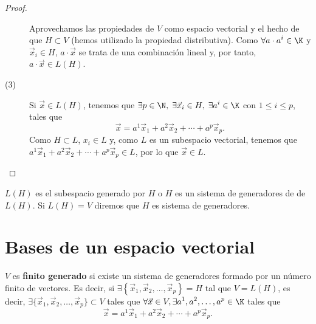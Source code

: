 \begin{proof}
\begin{description}
\[\]
Aprovechamos las propiedades de $\displaystyle V $ como espacio vectorial y el hecho de que $\displaystyle H \subset V $ (hemos utilizado la propiedad distributiva). Como $\displaystyle \forall a \cdot a^{i}\in\K $ y $\displaystyle \vec{x}_{i} \in H $, $\displaystyle a \cdot \vec{x} $ se trata de una combinación lineal y, por tanto, $\displaystyle a \cdot \vec{x} \in L\left(H\right) $.
\item[(3)] Si $\displaystyle \vec{x} \in L\left(H\right) $, tenemos que $\displaystyle \exists p \in \N, \; \exists \vec{x}_{i}\in H, \; \exists a ^{i} \in \K $ con $\displaystyle 1 \leq i \leq p $, tales que 
	\[ \vec{x} = a^{1}\vec{x}_{1}+a^{2}\vec{x}_{2} + \cdots + a^{p}\vec{x}_{p} .\]
Como $\displaystyle H \subset L $, $\displaystyle x_{i} \in L $ y, como $\displaystyle L $ es un subespacio vectorial, tenemos que $\displaystyle  a^{1}\vec{x}_{1}+a^{2}\vec{x}_{2} + \cdots + a^{p}\vec{x}_{p} \in L  $, por lo que $\displaystyle \vec{x}\in L $.
\end{description}
\end{proof}

\begin{fdefinition}[]
\normalfont $\displaystyle L\left(H\right) $ es el subespacio generado por $\displaystyle H $ o $\displaystyle H $ es un sistema de generadores de de $\displaystyle L\left(H\right) $. Si $\displaystyle L\left(H\right) = V $ diremos que $\displaystyle H $ es sistema de generadores.
\end{fdefinition}

\section{Bases de un espacio vectorial}

\begin{fdefinition}[]
\normalfont $\displaystyle V $ es \textbf{finito generado} si existe un sistema de generadores formado por un número finito de vectores. Es decir, si $\displaystyle \exists \left\{ \vec{x}_{1}, \vec{x}_{2}, \ldots, \vec{x}_{p}\right\} = H $ tal que $\displaystyle V = L\left(H\right) $, es decir, $\displaystyle \exists \{\vec{x}_{1}, \vec{x}_{2}, \ldots, \vec{x}_{p}\} \subset V $ tales que $\displaystyle \forall \vec{x}\in V, \exists a^{1}, a^{2}, \ldots, a^{p} \in \K $ tales que
\[\vec{x} = a^{1}\vec{x}_{1} + a^{2}\vec{x}_{2} + \cdots + a^{p}\vec{x}_{p} .\]
\end{fdefinition}

